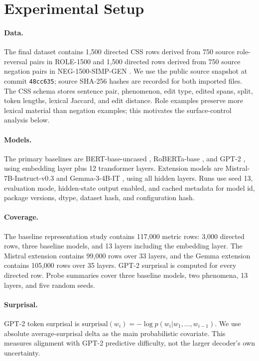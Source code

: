 \documentclass{article}
\begin{document}
\section{Experimental Setup}

\paragraph{Data.}
The final dataset contains 1,500 directed CSS rows derived from 750 source role-reversal pairs in ROLE-1500 and 1,500 directed rows derived from 750 source negation pairs in NEG-1500-SIMP-GEN \cite{shivagunde2023larger,textmachinelab2023datasetrepo}. We use the public source snapshot at commit \texttt{48cc635}; source SHA-256 hashes are recorded for both imported files. The CSS schema stores sentence pair, phenomenon, edit type, edited spans, split, token lengths, lexical Jaccard, and edit distance. Role examples preserve more lexical material than negation examples; this motivates the surface-control analysis below.

\paragraph{Models.}
The primary baselines are BERT-base-uncased \cite{devlin2019bert}, RoBERTa-base \cite{liu2019roberta}, and GPT-2 \cite{radford2019language}, using embedding layer plus 12 transformer layers. Extension models are Mistral-7B-Instruct-v0.3 \cite{jiang2023mistral,mistralai2024instructv03} and Gemma-3-4B-IT \cite{gemmateam2025gemma3,gemmateam2025gemma3modelcard}, using all hidden layers. Runs use seed 13, evaluation mode, hidden-state output enabled, and cached metadata for model id, package versions, dtype, dataset hash, and configuration hash.

\paragraph{Coverage.}
The baseline representation study contains 117,000 metric rows: 3,000 directed rows, three baseline models, and 13 layers including the embedding layer. The Mistral extension contains 99,000 rows over 33 layers, and the Gemma extension contains 105,000 rows over 35 layers. GPT-2 surprisal is computed for every directed row. Probe summaries cover three baseline models, two phenomena, 13 layers, and five random seeds.

\paragraph{Surprisal.}
GPT-2 token surprisal is $\mathrm{surprisal}(w_i)=-\log p(w_i|w_1,\ldots,w_{i-1})$. We use absolute average-surprisal delta as the main probabilistic covariate. This measures alignment with GPT-2 predictive difficulty, not the larger decoder's own uncertainty.
\end{document}

